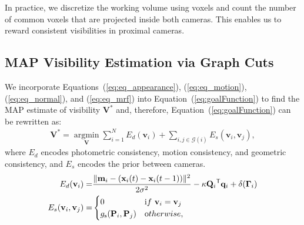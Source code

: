 
In practice, we discretize the working volume using voxels and count the number of common voxels that are projected inside both cameras. This enables us to reward consistent visibilities in proximal cameras. %

\subsection{MAP Visibility Estimation via Graph Cuts\label{sub:graphcuts}} 
We incorporate Equations~(\ref{eq:eq_appearance}), (\ref{eq:eq_motion}), (\ref{eq:eq_normal}), and (\ref{eq:eq_mrf}) into Equation~(\ref{eq:goalFunction}) to find the MAP estimate of visibility $\mathbf{V^*}$ and, therefore, Equation~(\ref{eq:goalFunction}) can be rewritten as:
\begin{eqnarray}
\mathbf{V^*} = \underset{\mathbf{V}}{\operatorname{argmin}}  \sum_{i=1}^{N} E_d( \mathbf{v}_i) + \sum_{ i, j \in \mathcal{G}(i) } E_s (\mathbf{v}_i,\mathbf{v}_j),
\end{eqnarray}
where $E_d$ encodes photometric consistency, motion consistency, and geometric consistency, and $E_s$ encodes the prior between cameras. 
\begin{eqnarray}
E_d(\mathbf{v}_i) =& \frac{\| \mathbf{m}_i - ( \mathbf{x}_i(t) - \mathbf{x}_i(t-1) )  \|^2} {2\sigma^2} -\kappa {\mathbf{Q}_i}^\mathsf{T} \mathbf{q}_i + \delta(\mathbf{\Gamma}_i ) \nonumber\\
E_s(\mathbf{v}_i,\mathbf{v}_j) =& \begin{cases} 0 & {\textrm if~} \mathbf{v}_i=\mathbf{v}_j  \nonumber\\                                                             
g_\textrm{s}(\mathbf{P}_i,\mathbf{P}_j) & {\textrm otherwise,}\end{cases} 
\end{eqnarray}
